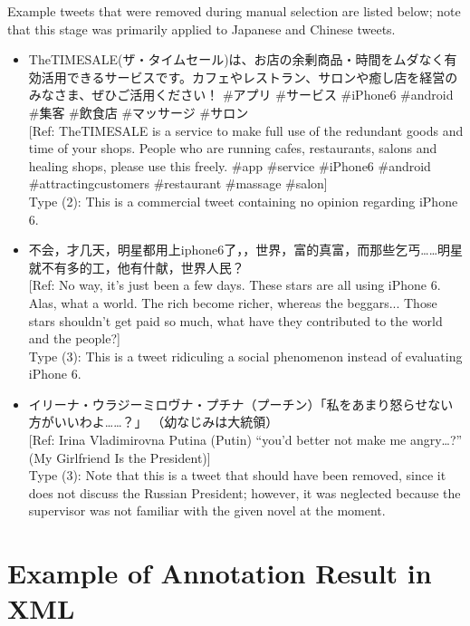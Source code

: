 \documentclass[english]{jnlp_1.4}
\begin{document}
\noindent Example tweets that were removed during manual selection are listed below; note that this stage was primarily applied to Japanese and Chinese tweets.
\begin{itemize}
\item TheTIMESALE(ザ・タイムセール)は、お店の余剰商品・時間をムダなく有効活用できるサービスです。カフェやレストラン、サロンや癒し店を経営のみなさま、ぜひご活用ください！ \#アプリ \#サービス \#iPhone6 \#android \#集客 \#飲食店 \#マッサージ \#サロン \\
{\sf \small [Ref: TheTIMESALE is a service to make full use of the redundant goods and time of your shops. People who are running cafes, restaurants, salons and healing shops, please use this freely. \#app \#service \#iPhone6 \#android \#attractingcustomers \#restaurant \#massage \#salon]} \\
Type (2): This is a commercial tweet containing no opinion regarding iPhone 6.
\item 不会，才几天，明星都用上iphone6了，，世界，富的真富，而那些乞丐……明星就不有多的工，他有什献，世界人民？ \\
{\sf \small [Ref: No way, it's just been a few days. These stars are all using iPhone 6. Alas, what a world. The rich become richer, whereas the beggars... Those stars shouldn't get paid so much, what have they contributed to the world and the people?]} \\
Type (3): This is a tweet ridiculing a social phenomenon instead of evaluating iPhone 6.
\item イリーナ・ウラジーミロヴナ・プチナ（プーチン）「私をあまり怒らせない方がいいわよ……？」 （幼なじみは大統領） \\
{\sf \small [Ref: Irina Vladimirovna Putina (Putin) ``you'd better not make me angry…?'' (My Girlfriend Is the President)]} \\
Type (3): Note that this is a tweet that should have been removed, since it does not discuss the Russian President; however, it was neglected because the supervisor was not familiar with the given novel at the moment.

\end{itemize}


\section{Example of Annotation Result in XML}
\end{document}
